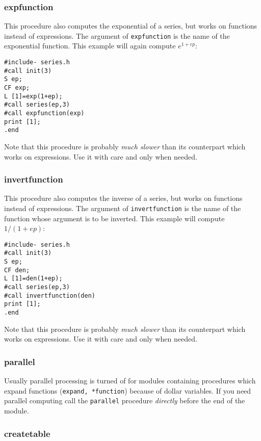 \documentclass{article}
\begin{document}
\subsubsection{expfunction}
\label{sec:exp_fun}

This procedure also computes the exponential of a series, but works on
functions instead of expressions. The argument of {\tt expfunction} is
the name of the exponential function. This example will again compute $e^{1+ep}$:
\begin{verbatim}
#include- series.h
#call init(3)
S ep;
CF exp;
L [1]=exp(1+ep);
#call series(ep,3)
#call expfunction(exp)
print [1];
.end
\end{verbatim}
Note that this procedure is probably {\it much slower} than its
counterpart which works on expressions. Use it with care and only when needed.

\subsubsection{invertfunction}
\label{sec:inv_fun}

This procedure also computes the inverse of a series, but works on
functions instead of expressions. The argument of {\tt invertfunction} is
the name of the function whose argument is to be inverted. This example will compute $1/(1+ep)$:
\begin{verbatim}
#include- series.h
#call init(3)
S ep;
CF den;
L [1]=den(1+ep);
#call series(ep,3)
#call invertfunction(den)
print [1];
.end
\end{verbatim}
Note that this procedure is probably {\it much slower} than its
counterpart which works on expressions. Use it with care and only when needed.

\subsubsection{parallel}
\label{sec:parallel}

Usually parallel processing is turned of for modules containing
procedures which expand functions ({\tt expand, *function}) because of
dollar variables. If you need
parallel computing call the {\tt parallel} procedure {\em directly}
  before the end of the module.

\subsubsection{createtable}
\label{sec:createtable}
\end{document}
